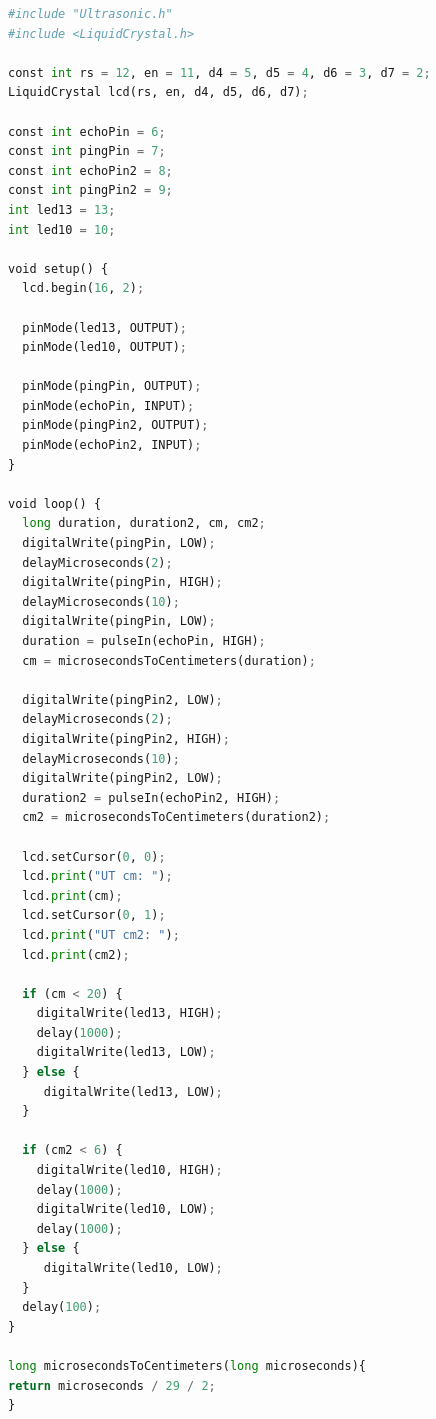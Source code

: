 \documentclass[transmag]{IEEEtran}
\begin{document}
\begin{lstlisting}[language=Python, caption=Arduino Programming]
#include "Ultrasonic.h"
#include <LiquidCrystal.h>

const int rs = 12, en = 11, d4 = 5, d5 = 4, d6 = 3, d7 = 2;
LiquidCrystal lcd(rs, en, d4, d5, d6, d7);

const int echoPin = 6; 
const int pingPin = 7; 
const int echoPin2 = 8; 
const int pingPin2 = 9; 
int led13 = 13;
int led10 = 10;

void setup() {
  lcd.begin(16, 2);

  pinMode(led13, OUTPUT);
  pinMode(led10, OUTPUT);
  
  pinMode(pingPin, OUTPUT); 
  pinMode(echoPin, INPUT); 
  pinMode(pingPin2, OUTPUT); 
  pinMode(echoPin2, INPUT); 
}

void loop() {
  long duration, duration2, cm, cm2;
  digitalWrite(pingPin, LOW);
  delayMicroseconds(2);
  digitalWrite(pingPin, HIGH);
  delayMicroseconds(10);
  digitalWrite(pingPin, LOW);
  duration = pulseIn(echoPin, HIGH);
  cm = microsecondsToCentimeters(duration); 

  digitalWrite(pingPin2, LOW);
  delayMicroseconds(2);
  digitalWrite(pingPin2, HIGH);
  delayMicroseconds(10);
  digitalWrite(pingPin2, LOW);
  duration2 = pulseIn(echoPin2, HIGH);
  cm2 = microsecondsToCentimeters(duration2); 

  lcd.setCursor(0, 0);
  lcd.print("UT cm: ");
  lcd.print(cm);
  lcd.setCursor(0, 1);
  lcd.print("UT cm2: ");
  lcd.print(cm2);
  
  if (cm < 20) {
    digitalWrite(led13, HIGH); 
    delay(1000);
    digitalWrite(led13, LOW);
  } else {
     digitalWrite(led13, LOW); 
  }
  
  if (cm2 < 6) {
    digitalWrite(led10, HIGH); 
    delay(1000);
    digitalWrite(led10, LOW);
    delay(1000);
  } else {
     digitalWrite(led10, LOW); 
  }
  delay(100); 
}

long microsecondsToCentimeters(long microseconds){
return microseconds / 29 / 2;
}
\end{lstlisting}
\end{document}
